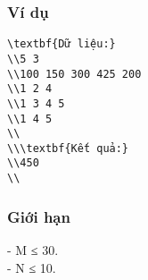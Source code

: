 \subsubsection{   Ví dụ  }
\begin{verbatim}
\textbf{Dữ liệu:}
\\5 3
\\100 150 300 425 200
\\1 2 4
\\1 3 4 5
\\1 4 5
\\
\\\textbf{Kết quả:}
\\450
\\\end{verbatim}

\subsubsection{   Giới hạn  }

   - M ≤ 30.   
\\   - N ≤ 10.  

